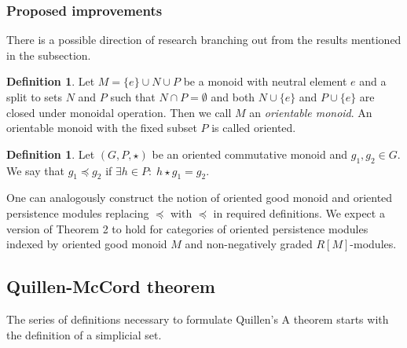 \documentclass[a4paper, 12pt]{article}
\newcounter{stmcounter}[section]
\numberwithin{equation}{section}
\theoremstyle{definition}
\newtheorem{definition}[stmcounter]{Definition}
\theoremstyle{remark}
\newcommand{\define}[1]{{\textit{#1}}}
\begin{document}
\subsubsection{Proposed improvements}

There is a possible direction of research branching out from the results mentioned in the subsection.

\begin{definition}
  Let $M = \{e\} \cup N \cup P$ be a monoid with neutral element $e$ and a split to sets $N$ and $P$ such that $N \cap P = \emptyset$ and both $N \cup \{e\}$ and $P \cup \{e\}$ are closed under monoidal operation. Then we call $M$ an \define{orientable monoid}. An orientable monoid with the fixed subset $P$ is called oriented.
\end{definition}

\begin{definition}
  Let $(G,P,\star)$ be an oriented commutative monoid and $g_1, g_2 \in G$.
  We say that $g_1 \preccurlyeq g_2$ if $\exists h \in P:\; h \star g_1 = g_2$.
\end{definition}

One can analogously construct the notion of oriented good monoid and oriented persistence modules replacing $\preceq$ with $\preccurlyeq$ in required definitions. We expect a version of Theorem 2 to hold for categories of oriented persistence modules indexed by oriented good monoid $M$ and non-negatively graded $R[M]$-modules.

\subsection{Quillen-McCord theorem}

The series of definitions necessary to formulate Quillen's A theorem starts with the definition of a simplicial set.
\end{document}
